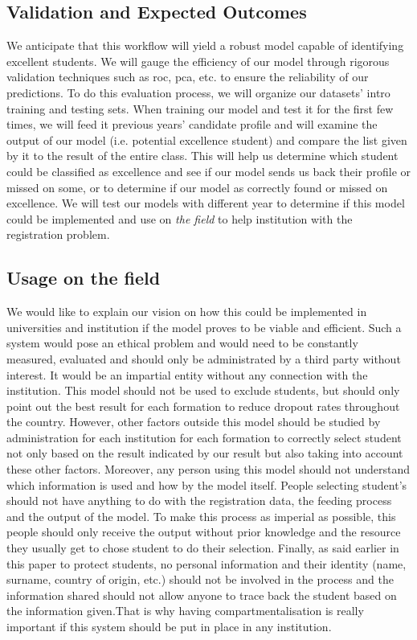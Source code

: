 \documentclass[../main.tex]{subfiles}
\begin{document}
\subsection{Validation and Expected Outcomes}
We anticipate that this workflow will yield a robust model capable of identifying excellent students. We will gauge the efficiency of our model through rigorous validation techniques such as \acrfull{roc}, \acrfull{pca}, etc. to ensure the reliability of our predictions. 
To do this evaluation process, we will organize our datasets' intro training and testing sets. When training our model and test it for the first few times, we will feed it previous years' candidate profile and will examine the output of our model (i.e. potential excellence student) and compare the list given by it to the result of the entire class. This will help us determine which student could be classified as excellence and see if our model sends us back their profile or missed on some, or  to determine if our model as correctly found or missed on excellence.  
We will test our models with different year to determine if this model could be implemented and use on \textit{the field} to help institution with the registration problem.

\subsection{Usage on the field}
We would like to explain our vision on how this could be implemented in universities and institution if the model proves to be viable and efficient. Such a system would pose an ethical problem and would need to be constantly measured, evaluated and should only be administrated by a third party without interest. It would be an impartial entity without any connection with the institution. 
This model should not be used to exclude students, but should only point out the best result for each formation to reduce dropout rates throughout the country. However, other factors outside this model should be studied by administration for each institution for each formation to correctly select student not only based on the result indicated by our result but also taking into account these other factors. Moreover, any person using this model should not understand which information is used and how by the model itself. People selecting student's should not have anything to do with the registration data, the feeding process and the output of the model. To make this process as imperial as possible, this people should only receive the output without prior knowledge and the resource they usually get to chose student to do their selection.  
Finally, as said earlier in this paper to protect students, no personal information and their identity (name, surname, country of origin, etc.) should not be involved in the process and the information shared should not allow anyone to trace back the student based on the information given.That is why having compartmentalisation is really important if this system should be put in place in any institution.
\end{document}
